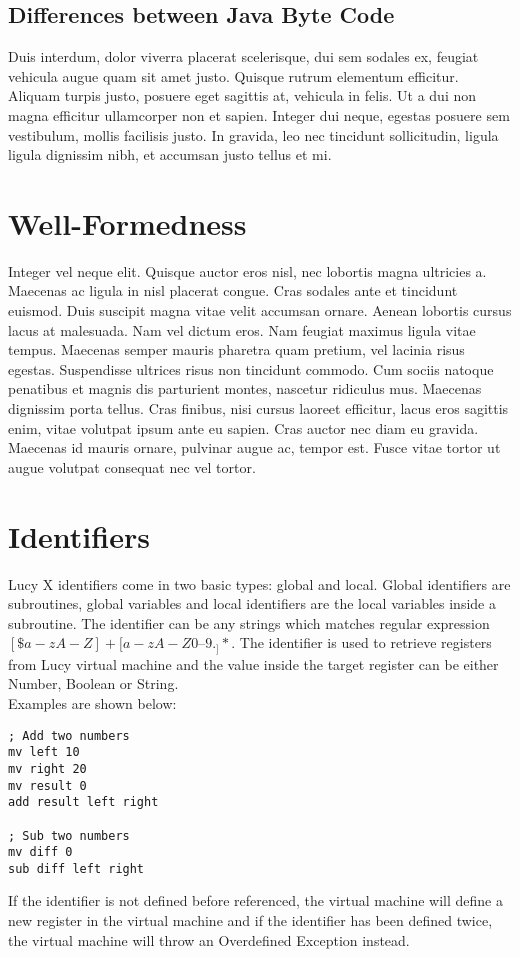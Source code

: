 \subsection{Differences between Java Byte Code}
Duis interdum, dolor viverra placerat scelerisque, dui sem sodales ex, feugiat vehicula augue quam sit amet justo. Quisque rutrum elementum efficitur. Aliquam turpis justo, posuere eget sagittis at, vehicula in felis. Ut a dui non magna efficitur ullamcorper non et sapien. Integer dui neque, egestas posuere sem vestibulum, mollis facilisis justo. In gravida, leo nec tincidunt sollicitudin, ligula ligula dignissim nibh, et accumsan justo tellus et mi.

\section{Well-Formedness}
Integer vel neque elit. Quisque auctor eros nisl, nec lobortis magna ultricies a. Maecenas ac ligula in nisl placerat congue. Cras sodales ante et tincidunt euismod. Duis suscipit magna vitae velit accumsan ornare. Aenean lobortis cursus lacus at malesuada. Nam vel dictum eros. Nam feugiat maximus ligula vitae tempus. Maecenas semper mauris pharetra quam pretium, vel lacinia risus egestas. Suspendisse ultrices risus non tincidunt commodo. Cum sociis natoque penatibus et magnis dis parturient montes, nascetur ridiculus mus. Maecenas dignissim porta tellus. Cras finibus, nisi cursus laoreet efficitur, lacus eros sagittis enim, vitae volutpat ipsum ante eu sapien. Cras auctor nec diam eu gravida. Maecenas id mauris ornare, pulvinar augue ac, tempor est. Fusce vitae tortor ut augue volutpat consequat nec vel tortor.


\section{Identifiers}
Lucy X identifiers come in two basic types: global and local. Global identifiers are subroutines, global variables and local identifiers are the local variables inside a subroutine. The identifier can be any strings which matches regular expression $[\$a-zA-Z]+[a-zA-Z0–9._]*$. The identifier is used to retrieve registers from Lucy virtual machine and the value inside the target register can be either Number, Boolean or String. \\
Examples are shown below:
\begin{lstlisting}[language=LucyX]
; Add two numbers
mv left 10
mv right 20
mv result 0
add result left right

; Sub two numbers
mv diff 0
sub diff left right
\end{lstlisting}
If the identifier is not defined before referenced, the virtual machine will define a new register in the virtual machine and if the identifier has been defined twice, the virtual machine will throw an Overdefined Exception instead.


